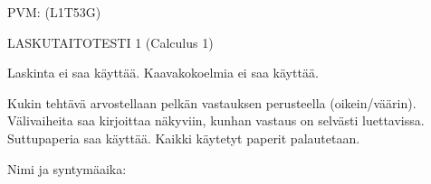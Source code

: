 \documentclass[finnish, a4paper, 12pt]{article}
\begin{document}
	
	
		PVM: \underline{\phantom{mm.mm.}}
		\hfill
		(L1T53G)	%
	
	\begin{center}
		{\large
			LASKUTAITOTESTI 1 (Calculus 1)}
	\end{center}
	
	Laskinta ei saa käyttää. Kaavakokoelmia ei saa käyttää.
	
	Kukin tehtävä arvostellaan pelkän vastauksen perusteella (oikein/väärin).
	Välivaiheita saa kirjoittaa näkyviin, kunhan vastaus on selvästi luettavissa.
	Suttupaperia saa käyttää. Kaikki käytetyt paperit palautetaan.
	
\vspace{12pt}
Nimi ja syntymäaika: \phantom{m} \hrulefill
\vspace{8pt}
	
\end{document}
